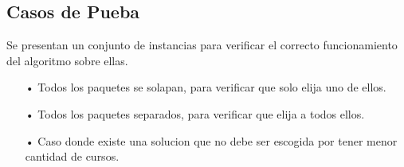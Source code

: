 \subsection{Casos de Pueba}

Se presentan un conjunto de instancias para verificar el correcto funcionamiento del algoritmo sobre ellas.

\begin{itemize}
\item[•]Todos los paquetes se solapan, para verificar que solo elija uno de ellos.
\item[•]Todos los paquetes separados, para verificar que elija a todos ellos.
\item[•]Caso donde existe una solucion que no debe ser escogida por tener menor cantidad de cursos.
\end{itemize}


